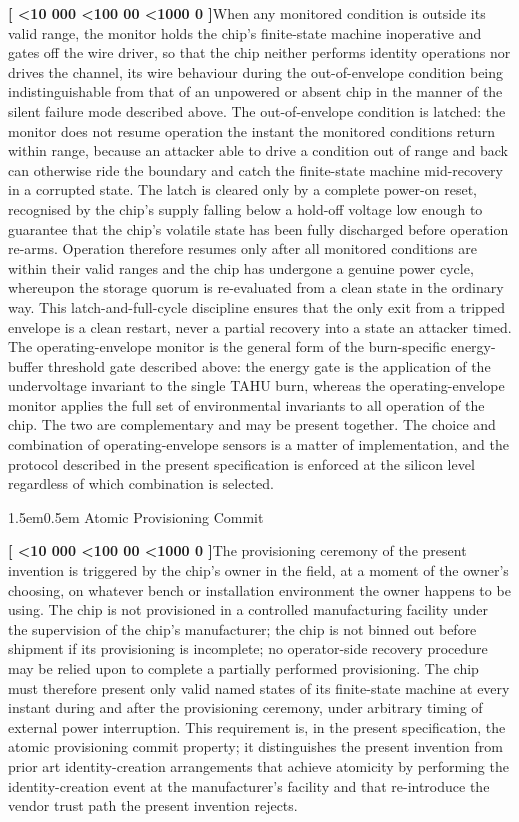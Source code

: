 \documentclass[12pt,letterpaper]{article}
\makeatletter
\newcounter{para}
\newcommand{\padzero}{%
  \ifnum\value{para}<10 000\else%
  \ifnum\value{para}<100 00\else%
  \ifnum\value{para}<1000 0\else%
  \fi\fi\fi}
\newcommand{\para}{%
  \refstepcounter{para}\noindent\textbf{[\padzero\arabic{para}]}\hspace{0.5em}\ignorespaces}
\renewcommand{\subsection}{\@startsection{subsection}{2}{0pt}%
  {1.5em}{0.5em}%
  {\normalfont\normalsize\bfseries}}
\makeatother
\begin{document}
\para When any monitored condition is outside its valid range, the monitor holds the chip's finite-state machine inoperative and gates off the wire driver, so that the chip neither performs identity operations nor drives the channel, its wire behaviour during the out-of-envelope condition being indistinguishable from that of an unpowered or absent chip in the manner of the silent failure mode described above. The out-of-envelope condition is latched: the monitor does not resume operation the instant the monitored conditions return within range, because an attacker able to drive a condition out of range and back can otherwise ride the boundary and catch the finite-state machine mid-recovery in a corrupted state. The latch is cleared only by a complete power-on reset, recognised by the chip's supply falling below a hold-off voltage low enough to guarantee that the chip's volatile state has been fully discharged before operation re-arms. Operation therefore resumes only after all monitored conditions are within their valid ranges and the chip has undergone a genuine power cycle, whereupon the storage quorum is re-evaluated from a clean state in the ordinary way. This latch-and-full-cycle discipline ensures that the only exit from a tripped envelope is a clean restart, never a partial recovery into a state an attacker timed. The operating-envelope monitor is the general form of the burn-specific energy-buffer threshold gate described above: the energy gate is the application of the undervoltage invariant to the single TAHU burn, whereas the operating-envelope monitor applies the full set of environmental invariants to all operation of the chip. The two are complementary and may be present together. The choice and combination of operating-envelope sensors is a matter of implementation, and the protocol described in the present specification is enforced at the silicon level regardless of which combination is selected.

\subsection{Atomic Provisioning Commit}

\para The provisioning ceremony of the present invention is triggered by the chip's owner in the field, at a moment of the owner's choosing, on whatever bench or installation environment the owner happens to be using. The chip is not provisioned in a controlled manufacturing facility under the supervision of the chip's manufacturer; the chip is not binned out before shipment if its provisioning is incomplete; no operator-side recovery procedure may be relied upon to complete a partially performed provisioning. The chip must therefore present only valid named states of its finite-state machine at every instant during and after the provisioning ceremony, under arbitrary timing of external power interruption. This requirement is, in the present specification, the atomic provisioning commit property; it distinguishes the present invention from prior art identity-creation arrangements that achieve atomicity by performing the identity-creation event at the manufacturer's facility and that re-introduce the vendor trust path the present invention rejects.
\end{document}
